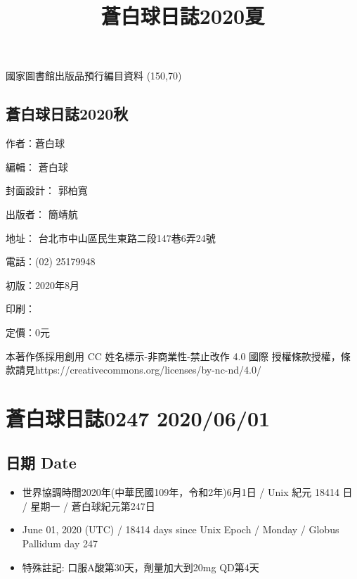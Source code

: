\documentclass[a5paper, 11pt
]{book}
\title{蒼白球日誌2020夏}
\date{}
\providecommand{\tightlist}{%
  \setlength{\itemsep}{0pt}\setlength{\parskip}{0pt}}
\begin{document}
\clearpage\maketitle
\thispagestyle{empty}
\subsection{}
\begin{flushleft}
國家圖書館出版品預行編目資料 \linebreak
\framebox(150,70){}
\end{flushleft}
\subsection{蒼白球日誌2020秋}
\begin{flushleft}
作者：蒼白球

編輯： 蒼白球

封面設計： 郭柏寬

出版者： 簡靖航

地址： 台北市中山區民生東路二段147巷6弄24號

電話：(02) 25179948

初版：2020年8月

印刷：

定價：0元

本著作係採用創用 CC 姓名標示-非商業性-禁止改作 4.0 國際 授權條款授權，條款請見\linebreak https://creativecommons.org/licenses/by-nc-nd/4.0/
\end{flushleft}
\clearpage
\tableofcontents

\hypertarget{ux84bcux767dux7403ux65e5ux8a8c0247-20200601}{%
\section{蒼白球日誌0247
2020/06/01}\label{ux84bcux767dux7403ux65e5ux8a8c0247-20200601}}

\hypertarget{ux65e5ux671f-date}{%
\subsection{日期 Date}\label{ux65e5ux671f-date}}

\begin{itemize}
\tightlist
\item
  世界協調時間2020年(中華民國109年，令和2年)6月1日 / Unix 紀元 18414 日
  / 星期一 / 蒼白球紀元第247日
\item
  June 01, 2020 (UTC) / 18414 days since Unix Epoch / Monday / Globus
  Pallidum day 247
\item
  特殊註記: 口服A酸第30天，劑量加大到20mg QD第4天
\end{itemize}
\end{document}
